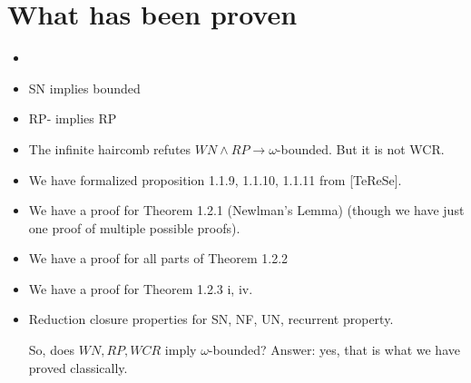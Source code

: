 \documentclass{scrartcl}
\begin{document}
\section{What has been proven}
\begin{itemize}
  \item {}
  \item SN implies bounded
  \item RP- implies RP
  \item The infinite haircomb refutes $WN \land RP \to \omega$-bounded.  But it is not WCR.
  \item We have formalized proposition 1.1.9, 1.1.10, 1.1.11 from [TeReSe].
  \item We have a proof for Theorem 1.2.1 (Newlman's Lemma) (though we have just one proof of multiple possible proofs).
  \item We have a proof for all parts of Theorem 1.2.2
  \item We have a proof for Theorem 1.2.3 i, iv.
  \item Reduction closure properties for SN, NF, UN, recurrent property.

  So, does $WN, RP, WCR$ imply $\omega$-bounded?
  Answer: yes, that is what we have proved classically.
\end{itemize}




\newpage
\end{document}
